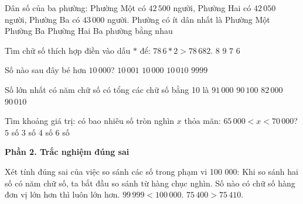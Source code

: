 \begin{ex} %
Dân số của ba phường: Phường Một có $42\,500$ người, Phường Hai có $42\,050$ người, Phường Ba có $43\,000$ người. Phường có ít dân nhất là
\choice
{Phường Một}
{Phường Ba}
{\True Phường Hai}
{Ba phường bằng nhau}
\end{ex}

\begin{ex} %
Tìm chữ số thích hợp điền vào dấu $*$ để: $78\,6*2 > 78\,682$.
\choice
{$8$}
{\True $9$}
{$7$}
{$6$}
\end{ex}

\begin{ex} %
Số nào sau đây bé hơn $10\,000$?
\choice
{$10\,001$}
{$10\,000$}
{$10\,010$}
{\True $9999$}
\end{ex}

\begin{ex} %
Số lớn nhất có năm chữ số có tổng các chữ số bằng 10 là
\choice
{\True $91\,000$}
{$90\,100$}
{$82\,000$}
{$90\,010$}
\end{ex}

\begin{ex} %
Tìm khoảng giá trị: có bao nhiêu số tròn nghìn $x$ thỏa mãn: $65\,000 < x < 70\,000$?
\choice
{$5$ số}
{$3$ số}
{\True $4$ số}
{$6$ số}
\end{ex}

\textbf{Phần 2. Trắc nghiệm đúng sai}

\begin{ex} %
Xét tính đúng sai của việc so sánh các số trong phạm vi 100 000:
\choiceTF
{\True Khi so sánh hai số có năm chữ số, ta bắt đầu so sánh từ hàng chục nghìn.}
{Số nào có chữ số hàng đơn vị lớn hơn thì luôn lớn hơn.}
{\True $99\,999 < 100\,000$.}
{$75\,400 > 75\,410$.}
\end{ex}

